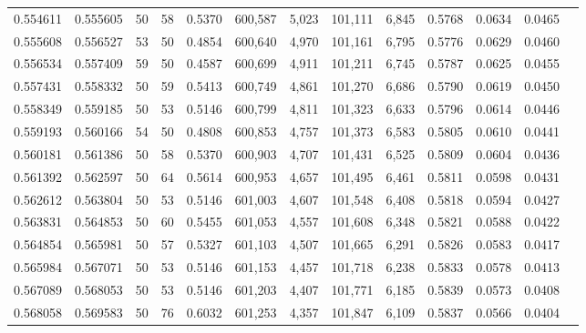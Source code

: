 \begin{tabular}{rrrrrrrrrrrrr}
0.554611 & 0.555605 &    50 &  58 &                                     0.5370 & 600,587 &   5,023 & 101,111 &   6,845 & 0.5768 & 0.0634 & 0.0465 \\
0.555608 & 0.556527 &    53 &  50 &                                     0.4854 & 600,640 &   4,970 & 101,161 &   6,795 & 0.5776 & 0.0629 & 0.0460 \\
0.556534 & 0.557409 &    59 &  50 &                                     0.4587 & 600,699 &   4,911 & 101,211 &   6,745 & 0.5787 & 0.0625 & 0.0455 \\
0.557431 & 0.558332 &    50 &  59 &                                     0.5413 & 600,749 &   4,861 & 101,270 &   6,686 & 0.5790 & 0.0619 & 0.0450 \\
0.558349 & 0.559185 &    50 &  53 &                                     0.5146 & 600,799 &   4,811 & 101,323 &   6,633 & 0.5796 & 0.0614 & 0.0446 \\
0.559193 & 0.560166 &    54 &  50 &                                     0.4808 & 600,853 &   4,757 & 101,373 &   6,583 & 0.5805 & 0.0610 & 0.0441 \\
0.560181 & 0.561386 &    50 &  58 &                                     0.5370 & 600,903 &   4,707 & 101,431 &   6,525 & 0.5809 & 0.0604 & 0.0436 \\
0.561392 & 0.562597 &    50 &  64 &                                     0.5614 & 600,953 &   4,657 & 101,495 &   6,461 & 0.5811 & 0.0598 & 0.0431 \\
0.562612 & 0.563804 &    50 &  53 &                                     0.5146 & 601,003 &   4,607 & 101,548 &   6,408 & 0.5818 & 0.0594 & 0.0427 \\
0.563831 & 0.564853 &    50 &  60 &                                     0.5455 & 601,053 &   4,557 & 101,608 &   6,348 & 0.5821 & 0.0588 & 0.0422 \\
0.564854 & 0.565981 &    50 &  57 &                                     0.5327 & 601,103 &   4,507 & 101,665 &   6,291 & 0.5826 & 0.0583 & 0.0417 \\
0.565984 & 0.567071 &    50 &  53 &                                     0.5146 & 601,153 &   4,457 & 101,718 &   6,238 & 0.5833 & 0.0578 & 0.0413 \\
0.567089 & 0.568053 &    50 &  53 &                                     0.5146 & 601,203 &   4,407 & 101,771 &   6,185 & 0.5839 & 0.0573 & 0.0408 \\
0.568058 & 0.569583 &    50 &  76 &                                     0.6032 & 601,253 &   4,357 & 101,847 &   6,109 & 0.5837 & 0.0566 & 0.0404 \\

\end{tabular}
